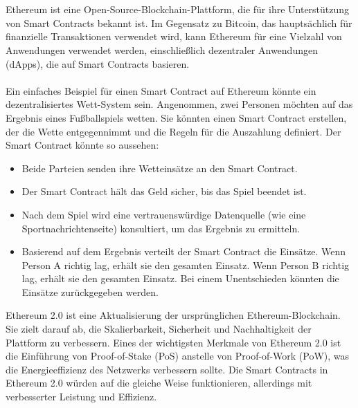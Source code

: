 \\\\
Ethereum ist eine Open-Source-Blockchain-Plattform, die für ihre Unterstützung von Smart Contracts bekannt ist. Im Gegensatz zu Bitcoin, das hauptsächlich für finanzielle Transaktionen verwendet wird, kann Ethereum für eine Vielzahl von Anwendungen verwendet werden, einschließlich dezentraler Anwendungen (dApps), die auf Smart Contracts basieren.
\\\\
Ein einfaches Beispiel für einen Smart Contract auf Ethereum könnte ein dezentralisiertes Wett-System sein. Angenommen, zwei Personen möchten auf das Ergebnis eines Fußballspiels wetten. Sie könnten einen Smart Contract erstellen, der die Wette entgegennimmt und die Regeln für die Auszahlung definiert. Der Smart Contract könnte so aussehen:
\begin{itemize}
\item Beide Parteien senden ihre Wetteinsätze an den Smart Contract.
\item Der Smart Contract hält das Geld sicher, bis das Spiel beendet ist.
\item Nach dem Spiel wird eine vertrauenswürdige Datenquelle (wie eine Sportnachrichtenseite) konsultiert, um das Ergebnis zu ermitteln.
\item Basierend auf dem Ergebnis verteilt der Smart Contract die Einsätze. Wenn Person A richtig lag, erhält sie den gesamten Einsatz. Wenn Person B richtig lag, erhält sie den gesamten Einsatz. Bei einem Unentschieden könnten die Einsätze zurückgegeben werden.
\end{itemize}
Ethereum 2.0 ist eine Aktualisierung der ursprünglichen Ethereum-Blockchain. Sie zielt darauf ab, die Skalierbarkeit, Sicherheit und Nachhaltigkeit der Plattform zu verbessern. Eines der wichtigsten Merkmale von Ethereum 2.0 ist die Einführung von Proof-of-Stake (PoS) anstelle von Proof-of-Work (PoW), was die Energieeffizienz des Netzwerks verbessern sollte. Die Smart Contracts in Ethereum 2.0 würden auf die gleiche Weise funktionieren, allerdings mit verbesserter Leistung und Effizienz.



